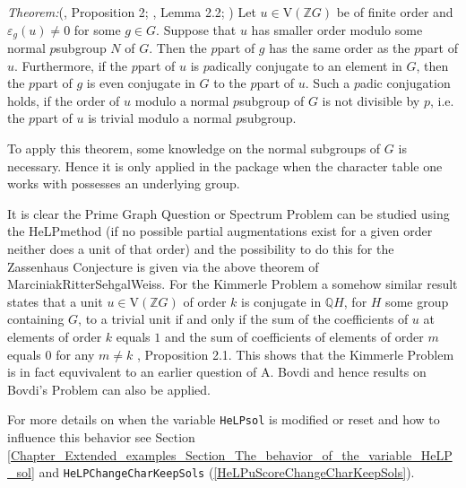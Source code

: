 \documentclass[a4paper,11pt]{report}
\begin{document}
{{ \emph{Theorem:}(\cite{HertweckSolvable}, Proposition 2; \cite{HertweckEdinb}, Lemma 2.2; \cite{MargolisHertweck}) Let $u \in \mathrm{V}(\mathbb{Z}G)$ be of finite order and $\varepsilon_g(u) \neq 0$ for some $g \in G$. Suppose that $u$ has smaller order modulo some normal $p$\texttt{}subgroup $N$ of $G$. Then the $p$\texttt{}part of $g$ has the same order as the $p$\texttt{}part of $u$. Furthermore, if the $p$\texttt{}part of $u$ is $p$\texttt{}adically conjugate to an element in $G$, then the $p$\texttt{}part of $g$ is even conjugate in $G$ to the $p$\texttt{}part of $u$. Such a $p$\texttt{}adic conjugation holds, if the order of $u$ modulo a normal $p$\texttt{}subgroup of $G$ is not divisible by $p$, i.e. the $p$\texttt{}part of $u$ is trivial modulo a normal $p$\texttt{}subgroup. 

 To apply this theorem, some knowledge on the normal subgroups of $G$ is necessary. Hence it is only applied in the package when the character table
one works with possesses an underlying group.

 

 It is clear the Prime Graph Question or Spectrum Problem can be studied using
the HeLP\texttt{}method (if no possible partial augmentations exist
for a given order neither does a unit of that order) and the possibility to do
this for the Zassenhaus Conjecture is given via the above theorem of
Marciniak\texttt{}Ritter\texttt{}Sehgal\texttt{}Weiss.
For the Kimmerle Problem a somehow similar result states that a unit $u \in \mathrm{V}(\mathbb{Z}G)$ of order $k$ is conjugate in $\mathbb{Q}H$, for $H$ some group containing $G$, to a trivial unit if and only if the sum of the coefficients of $u$ at elements of order $k$ equals $1$ and the sum of coefficients of elements of order $m$ equals $0$ for any $m \neq k$ \cite{MargolisDelRioPAP}, Proposition 2.1. This shows that the Kimmerle Problem is in fact equvivalent
to an earlier question of A. Bovdi and hence results on Bovdi's Problem can
also be applied.

 

 For more details on when the variable \texttt{HeLP{\textunderscore}sol} is modified or reset and how to influence this behavior see Section \ref{Chapter_Extended_examples_Section_The_behavior_of_the_variable_HeLP_sol} and \texttt{HeLP{\textunderscore}ChangeCharKeepSols} (\ref{HeLPuScoreChangeCharKeepSols}). 

}}
\end{document}
